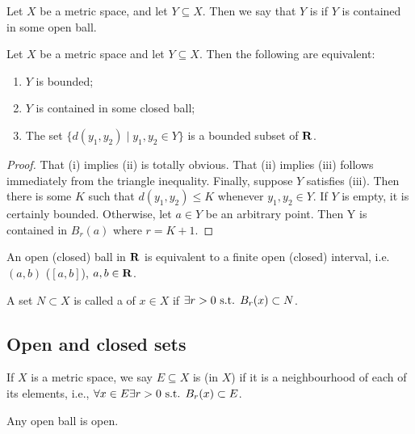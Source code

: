 \begin{definition}[Bounded]
Let $X$ be a metric space, and let $Y\subseteq X$. Then we say that $Y$ is  if $Y$ is contained in some open ball.
\end{definition}

\begin{proposition}
Let $X$ be a metric space and let $Y\subseteq X$. Then the following are equivalent:\
\begin{enumerate}[label=(\roman*)]
\item $Y$ is bounded;
\item $Y$ is contained in some closed ball;
\item The set $\{d(y_1,y_2)\mid y_1,y_2\in Y\}$ is a bounded subset of $\mathbf R$.
\end{enumerate}
\end{proposition}

\begin{proof}
That (i) implies (ii) is totally obvious. That (ii) implies (iii) follows immediately from the triangle inequality. Finally, suppose $Y$ satisfies (iii). Then there is some $K$ such that $d(y_1,y_2)\le K$ whenever $y_1,y_2\in Y$. If $Y$ is empty, it is certainly bounded. Otherwise, let $a\in Y$ be an arbitrary point. Then Y is contained in $B_r(a)$ where $r=K+1$.
\end{proof}

\begin{example}
An open (closed) ball in $\mathbf R$ is equivalent to a finite open (closed) interval, i.e. $(a,b)$ ($[a,b]$), $a,b\in\mathbf R$.
\end{example}

\begin{definition}[Neighbourhood]
A set $N\subset X$ is called a  of $x\in X$ if $\exists r>0\text{ s.t. } B_r(x)\subset N$.
\end{definition}

\subsection{Open and closed sets}
\begin{definition}
If $X$ is a metric space, we say $E\subseteq X$ is  (in $X$) if it is a neighbourhood of each of its elements, i.e.,  $\forall x\in E\exists r>0\text{ s.t. } B_r(x)\subset E$.
\end{definition}

\begin{proposition}
Any open ball is open.
\end{proposition}


